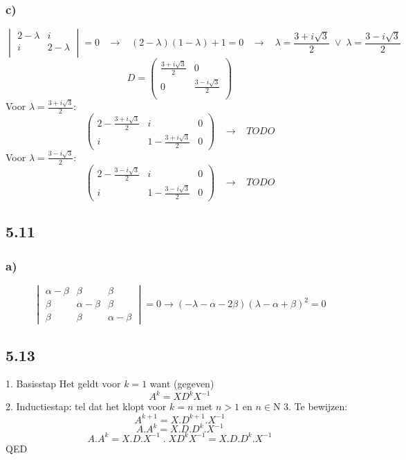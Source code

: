 \documentclass[11pt]{article}
\begin{document}
\subsubsection*{c)}
\[
\begin{vmatrix}
2-\lambda & i\\
i & 2- \lambda \\
\end{vmatrix}
=0
\;\;\;\longrightarrow\;\;\;
(2-\lambda)(1-\lambda)+1=0
\;\;\;\longrightarrow\;\;\;
\lambda = \frac{3+i\sqrt{3}}{2} \;\vee\; \lambda = \frac{3-i\sqrt{3}}{2}
\]
\[
D = 
\begin{pmatrix}
\frac{3+i\sqrt{3}}{2} & 0\\
0 & \frac{3-i\sqrt{3}}{2}\\
\end{pmatrix}
\]
Voor $\lambda = \frac{3+i\sqrt{3}}{2}$: 
\[
\left(
\begin{array}{cc|c}
2-\frac{3+i\sqrt{3}}{2} & i & 0 \\
i & 1-\frac{3+i\sqrt{3}}{2} & 0
\end{array}
\right)
\;\;\;\longrightarrow\;\;\;
TODO
\]
Voor $\lambda = \frac{3-i\sqrt{3}}{2}$: 
\[
\left(
\begin{array}{cc|c}
2-\frac{3-i\sqrt{3}}{2} & i & 0 \\
i & 1-\frac{3-i\sqrt{3}}{2} & 0
\end{array}
\right)
\;\;\;\longrightarrow\;\;\;
TODO
\]

\subsection*{5.11}
\subsubsection*{a)}
\[
\begin{vmatrix}
\alpha-\beta & \beta & \beta \\
\beta & \alpha-\beta & \beta \\
\beta & \beta & \alpha-\beta
\end{vmatrix}
=0
\longrightarrow
(-\lambda-\alpha-2\beta)(\lambda-\alpha+\beta)^2 = 0
\]

\subsection*{5.13}
1. Basisstap
Het geldt voor $k=1$ want (gegeven)
\[
A^k = XD^kX^{-1}
\]
2. Inductiestap: tel dat het klopt voor $k=n$ met $n>1$ en $n \in \mathrm{N}$
3. Te bewijzen: 
\[
A^{k+1} = X.D^{k+1}.X^{-1}
\]
\[
A.A^k = X.D.D^k.X^{-1}
\]
\[
A.A^k = X.D.X^{-1}\;.\;XD^kX^{-1} = X.D.D^k.X^{-1}
\]
QED
\end{document}
